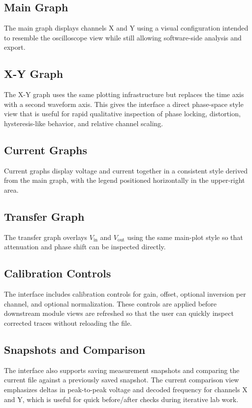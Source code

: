 \documentclass[conference]{IEEEtran}
\begin{document}
\subsection{Main Graph}
The main graph displays channels X and Y using a visual configuration intended to resemble the oscilloscope view while still allowing software-side analysis and export.

\subsection{X-Y Graph}
The X-Y graph uses the same plotting infrastructure but replaces the time axis with a second waveform axis. This gives the interface a direct phase-space style view that is useful for rapid qualitative inspection of phase locking, distortion, hysteresis-like behavior, and relative channel scaling.

\subsection{Current Graphs}
Current graphs display voltage and current together in a consistent style derived from the main graph, with the legend positioned horizontally in the upper-right area.

\subsection{Transfer Graph}
The transfer graph overlays $V_{\mathrm{in}}$ and $V_{\mathrm{out}}$ using the same main-plot style so that attenuation and phase shift can be inspected directly.

\subsection{Calibration Controls}
The interface includes calibration controls for gain, offset, optional inversion per channel, and optional normalization. These controls are applied before downstream module views are refreshed so that the user can quickly inspect corrected traces without reloading the file.

\subsection{Snapshots and Comparison}
The interface also supports saving measurement snapshots and comparing the current file against a previously saved snapshot. The current comparison view emphasizes deltas in peak-to-peak voltage and decoded frequency for channels X and Y, which is useful for quick before/after checks during iterative lab work.
\end{document}
